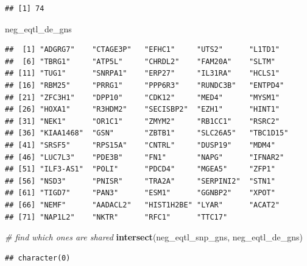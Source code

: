 \documentclass[]{article}
\newenvironment{Shaded}{\begin{snugshade}}{\end{snugshade}}
\newcommand{\KeywordTok}[1]{\textcolor[rgb]{0.13,0.29,0.53}{\textbf{#1}}}
\newcommand{\StringTok}[1]{\textcolor[rgb]{0.31,0.60,0.02}{#1}}
\newcommand{\CommentTok}[1]{\textcolor[rgb]{0.56,0.35,0.01}{\textit{#1}}}
\newcommand{\OperatorTok}[1]{\textcolor[rgb]{0.81,0.36,0.00}{\textbf{#1}}}
\newcommand{\NormalTok}[1]{#1}
\begin{document}
\begin{Shaded}
\end{Shaded}

\begin{verbatim}
## [1] 74
\end{verbatim}

\begin{Shaded}
\begin{Highlighting}[]
\NormalTok{neg_eqtl_de_gns}
\end{Highlighting}
\end{Shaded}

\begin{verbatim}
##  [1] "ADGRG7"    "CTAGE3P"   "EFHC1"     "UTS2"      "L1TD1"    
##  [6] "TBRG1"     "ATP5L"     "CHRDL2"    "FAM20A"    "SLTM"     
## [11] "TUG1"      "SNRPA1"    "ERP27"     "IL31RA"    "HCLS1"    
## [16] "RBM25"     "PRRG1"     "PPP6R3"    "RUNDC3B"   "ENTPD4"   
## [21] "ZFC3H1"    "DPP10"     "CDK12"     "MED4"      "MYSM1"    
## [26] "HOXA1"     "R3HDM2"    "SECISBP2"  "EZH1"      "HINT1"    
## [31] "NEK1"      "OR1C1"     "ZMYM2"     "RB1CC1"    "RSRC2"    
## [36] "KIAA1468"  "GSN"       "ZBTB1"     "SLC26A5"   "TBC1D15"  
## [41] "SRSF5"     "RPS15A"    "CNTRL"     "DUSP19"    "MDM4"     
## [46] "LUC7L3"    "PDE3B"     "FN1"       "NAPG"      "IFNAR2"   
## [51] "ILF3-AS1"  "POLI"      "PDCD4"     "MGEA5"     "ZFP1"     
## [56] "NSD3"      "PNISR"     "TRA2A"     "SERPINI2"  "STN1"     
## [61] "TIGD7"     "PAN3"      "ESM1"      "GGNBP2"    "XPOT"     
## [66] "NEMF"      "AADACL2"   "HIST1H2BE" "LYAR"      "ACAT2"    
## [71] "NAP1L2"    "NKTR"      "RFC1"      "TTC17"
\end{verbatim}

\begin{Shaded}
\begin{Highlighting}[]
\CommentTok{# find which ones are shared}
\KeywordTok{intersect}\NormalTok{(neg_eqtl_snp_gns, neg_eqtl_de_gns)}
\end{Highlighting}
\end{Shaded}

\begin{verbatim}
## character(0)
\end{verbatim}
\end{document}

